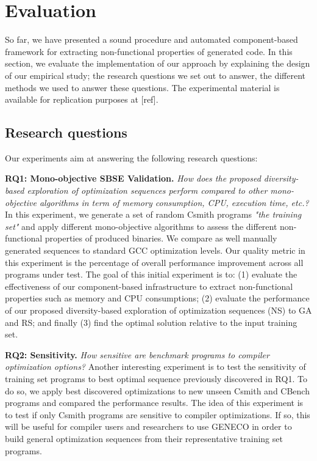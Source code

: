 \section{Evaluation}
So far, we have presented a sound procedure and automated component-based framework for extracting non-functional properties of generated code. In this section, we evaluate the implementation of our approach by explaining the design of our empirical study; the research questions we set out to answer, the different methods we used to answer these questions. The experimental material is
available for replication purposes at [ref].

\subsection{Research questions}
Our experiments aim at answering the following research questions:

\textbf{RQ1: Mono-objective SBSE Validation.} 
\textit{How does the proposed diversity-based exploration of optimization sequences perform compared to other mono-objective algorithms in term of memory consumption, CPU, execution time, etc.?} 
In this experiment, we generate a set of random Csmith programs \textit{"the training set"} and apply different mono-objective algorithms to assess the different non-functional properties of produced binaries. We compare as well manually generated sequences to standard GCC optimization levels. Our quality metric in this experiment is the percentage of overall performance improvement across all programs under test. The goal of this initial experiment is to: (1) evaluate the effectiveness of our component-based infrastructure to extract non-functional properties such as memory and CPU consumptions; (2) evaluate the performance of our proposed diversity-based exploration of optimization sequences (NS) to GA and RS; and finally (3) find the optimal solution relative to the input training set. 

\textbf{RQ2: Sensitivity.} 
\textit{How sensitive are benchmark programs to compiler optimization options?}
Another interesting experiment is to test the sensitivity of training set programs to best optimal sequence previously discovered in RQ1. To do so, we apply best discovered optimizations to new unseen Csmith and CBench programs and compared the performance results. The idea of this experiment is to test if only Csmith programs are sensitive to compiler optimizations. If so, this will be useful for compiler users and researchers to use GENECO in order to build general optimization sequences from their representative training set programs.



